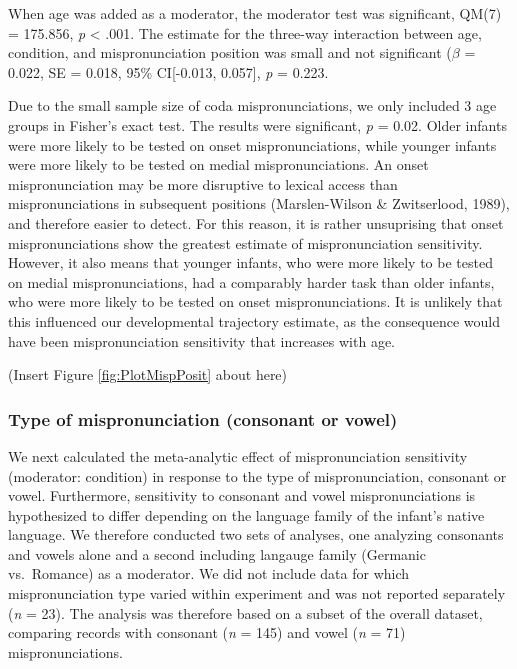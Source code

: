 \documentclass[man]{apa6}
\begin{document}
When age was added as a moderator, the moderator test was significant, QM(7) = 175.856, \emph{p} \textless{} .001. The estimate for the three-way interaction between age, condition, and mispronunciation position was small and not significant (\(\beta\) = 0.022, SE = 0.018, 95\% CI{[}-0.013, 0.057{]}, \emph{p} = 0.223.

Due to the small sample size of coda mispronunciations, we only included 3 age groups in Fisher's exact test. The results were significant, \emph{p} = 0.02. Older infants were more likely to be tested on onset mispronunciations, while younger infants were more likely to be tested on medial mispronunciations. An onset mispronunciation may be more disruptive to lexical access than mispronunciations in subsequent positions (Marslen-Wilson \& Zwitserlood, 1989), and therefore easier to detect. For this reason, it is rather unsuprising that onset mispronunciations show the greatest estimate of mispronunciation sensitivity. However, it also means that younger infants, who were more likely to be tested on medial mispronunciations, had a comparably harder task than older infants, who were more likely to be tested on onset mispronunciations. It is unlikely that this influenced our developmental trajectory estimate, as the consequence would have been mispronunciation sensitivity that increases with age.

(Insert Figure \ref{fig:PlotMispPosit} about here)

\hypertarget{type-of-mispronunciation-consonant-or-vowel}{%
\subsubsection{Type of mispronunciation (consonant or vowel)}\label{type-of-mispronunciation-consonant-or-vowel}}

We next calculated the meta-analytic effect of mispronunciation sensitivity (moderator: condition) in response to the type of mispronunciation, consonant or vowel. Furthermore, sensitivity to consonant and vowel mispronunciations is hypothesized to differ depending on the language family of the infant's native language. We therefore conducted two sets of analyses, one analyzing consonants and vowels alone and a second including langauge family (Germanic vs.~Romance) as a moderator. We did not include data for which mispronunciation type varied within experiment and was not reported separately (\emph{n} = 23). The analysis was therefore based on a subset of the overall dataset, comparing records with consonant (\emph{n} = 145) and vowel (\emph{n} = 71) mispronunciations.
\end{document}
